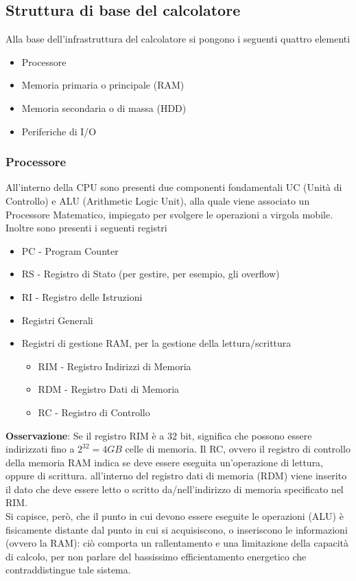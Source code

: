 \documentclass[a4paper]{extarticle}
\begin{document}
\subsection{Struttura di base del calcolatore}
Alla base dell'infrastruttura del calcolatore si pongono i seguenti quattro elementi
\begin{itemize}
    \item Processore
    \item Memoria primaria o principale (RAM)
    \item Memoria secondaria o di massa (HDD)
    \item Periferiche di I/O
\end{itemize}

\vspace{1em}
\subsubsection{Processore}
All'interno della CPU sono presenti due componenti fondamentali UC (Unità di Controllo) e ALU (Arithmetic Logic Unit), alla quale viene associato un Processore Matematico, impiegato per svolgere le operazioni a virgola mobile. Inoltre sono presenti i seguenti registri
\begin{itemize}
    \item PC - Program Counter
    \item RS - Registro di Stato (per gestire, per esempio, gli overflow)
    \item RI - Registro delle Istruzioni
    \item Registri Generali
    \item Registri di gestione RAM, per la gestione della lettura/scrittura
    \begin{itemize}
        \item RIM - Registro Indirizzi di Memoria
        \item RDM - Registro Dati di Memoria
        \item RC - Registro di Controllo
    \end{itemize}
\end{itemize}

\vspace{1em}
\noindent
\textbf{Osservazione}: Se il registro RIM è a \(32\) bit, significa che possono essere indirizzati fino a \(2^32 = 4GB\) celle di memoria. Il RC, ovvero il registro di controllo della memoria RAM indica se deve essere eseguita un'operazione di lettura, oppure di scrittura. all'interno del registro dati di memoria (RDM) viene inserito il dato che deve essere letto o scritto da/nell'indirizzo di memoria specificato nel RIM.\\
Si capisce, però, che il punto in cui devono essere eseguite le operazioni (ALU) è fisicamente distante dal punto in cui si acquisiscono, o inseriscono le informazioni (ovvero la RAM): ciò comporta un rallentamento e una limitazione della capacità di calcolo, per non parlare del bassissimo efficientamento energetico che contraddistingue tale sistema.
\end{document}
